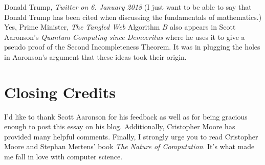 \documentclass{article}
\begin{document}
\begin{thebibliography}{1}
Donald Trump, \textit{Twitter on 6. January 2018} (I just want to be able to say that Donald Trump has been cited when discussing the fundamentals of mathematics.)
Yes, Prime Minister, \textit{The Tangled Web}
 Algorithm $B$ also appears in Scott Aaronson's \textit{Quantum Computing since Democritus} where he uses it to give a pseudo proof of the Second Incompleteness Theorem. It was in plugging the holes in Aaronson's argument that these ideas took their origin.
\end{thebibliography}

\section*{Closing Credits}

I'd like to thank Scott Aaronson for his feedback as well as for being gracious enough to post this essay on his blog. Additionally, Cristopher Moore has provided many helpful comments. Finally, I strongly urge you to read Cristopher Moore and Stephan Mertens' book \textit{The Nature of Computation}. It's what made me fall in love with computer science.

\vfill\eject
\end{document}
